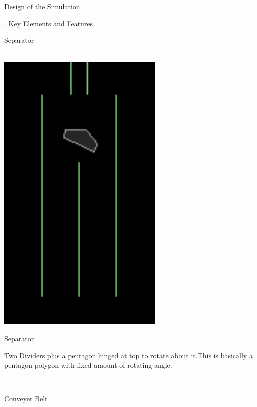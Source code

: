 \documentclass[a4paper,11pt]{resume}
\begin{document}
\begin{rSection}{{\heading Design of the Simulation}}
\begin{rSubsection}{{. Key Elements and Features}}{}{}{}
\begin{rSubsection}{{ Separator}}{}{}{}
\\ \\
\begin{minipage}{0.15\textwidth}
\centering
\includegraphics[width=0.6\textwidth,scale=0.4]{separator.png}
\label{fig:find}
\caption{Separator}
\end{minipage}
\begin{minipage}{0.80\textwidth}
Two Dividers plus a pentagon hinged at top to rotate about it.This is basically a pentagon polygon with fixed amount of rotating angle.
\end{minipage}
\\
\end{rSubsection}
\begin{rSubsection}{{ Conveyer Belt}}{}{}{}
\\ \\


\end{rSubsection}
\end{rSubsection}
\end{rSection}
\end{document}
